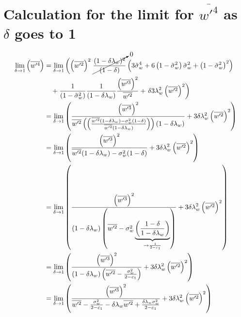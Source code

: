 \section{Calculation for the limit for \texorpdfstring{$\overline{w'^4}$}{wprime4bar} as \texorpdfstring{$\delta$}{delta} goes to 1}
\label{sec:calculation-for-the-limit-for-wprime4bar-as-delta-goes-to-1}

\begin{align}
    \label{eq:limit_wprime4_delta_to_1_calc}
    \lim_{\delta \to 1}\left(\overline{w'^4}\right)
    &= \lim_{\delta \to 1}
    \left(\left(\overline{w'^2}\right)^2\right.
    \cancelto{0}{\frac{(1-\delta \lambda_w)^2}{(1-\delta)}}
    \left(3 \tilde{\sigma}_w^4 + 6 \left( 1 - \tilde{\sigma}_w^2 \right) \tilde{\sigma}_w^2 + \left( 1 - \tilde{\sigma}_w^2 \right)^2\right) \nonumber\\
    &\quad+ \frac{1}{\left( 1 - \tilde{\sigma}_w^2 \right)} \frac{1}{(1-\delta \lambda_w)}
    \frac{\left(\overline{w'^3}\right)^2}{\overline{w'^2}}
    + \left. \delta 3 \lambda_w^2 \left(\overline{w'^2}\right)^2\right)
    \\
    &= \lim_{\delta \to 1}
    \left(
    \frac{
        \left(\overline{w'^3}\right)^2
    }
    {
        \overline{w'^2}
        \left(\left(\frac{\overline{w'^2} (1-\delta\lambda_w) - \sigma_w^2 (1-\delta)}{\overline{w'^2} (1-\delta\lambda_w)}\right)\right)
        (1-\delta \lambda_w)
    }
    + 3 \delta \lambda_w^2 \left(\overline{w'^2}\right)^2
    \right)
    \\
    &= \lim_{\delta \to 1}
    \left(
    \frac{
        \left(\overline{w'^3}\right)^2
    }{
        \overline{w'^2} (1-\delta\lambda_w) - \sigma_w^2 (1-\delta)
    }
    + 3 \delta \lambda_w^2 \left(\overline{w'^2}\right)^2
    \right)
    \\
    &= \lim_{\delta \to 1}
    \left(
    \frac{
        \left(\overline{w'^3}\right)^2
    }{
        (1-\delta\lambda_w)
        \left(\overline{w'^2} - \sigma_w^2 \underbrace{\left(\frac{1-\delta}{1-\delta\lambda_w}\right)}_{\to \frac{1}{2 - c_1}}\right)
    }
    + 3 \delta \lambda_w^2 \left(\overline{w'^2}\right)^2
    \right)
    \\
    &= \lim_{\delta \to 1}
    \left(
    \frac{
        \left(\overline{w'^3}\right)^2
    }{
        (1-\delta\lambda_w)
        \left(\overline{w'^2} - \frac{\sigma_w^2}{2 - c_1}\right)
    }
    + 3 \delta \lambda_w^2 \left(\overline{w'^2}\right)^2
    \right)
    \\
    &= \lim_{\delta \to 1}
    \left(
    \frac{
        \left(\overline{w'^3}\right)^2
    }{
        \overline{w'^2} - \frac{\sigma_w^2}{2 - c_1} - \delta \lambda_w \overline{w'^2} + \frac{\delta \lambda_w \sigma_w^2}{2 - c_1}
    }
    + 3 \delta \lambda_w^2 \left(\overline{w'^2}\right)^2
    \right)
\end{align}



